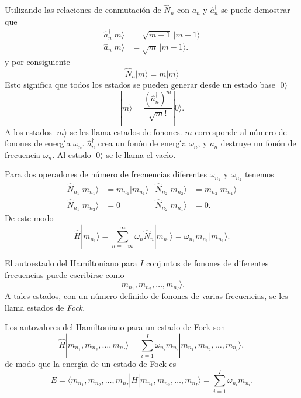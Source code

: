 Utilizando las relaciones de conmutaci\'on de $\widehat{N}_n$ con $a_n$ y $\hat{a}^\dagger_n$ se puede demostrar que 
\begin{align}
  \hat{a}^\dagger_n|m\rangle&=\sqrt{m+1}\,|m+1\rangle\nonumber\\
  \hat{a}_n|m\rangle&=\sqrt{m}\,|m-1\rangle.
\end{align}
y por consiguiente
\begin{equation}
  \widehat{N}_n|m\rangle=m|m\rangle
\end{equation}
Esto significa que todos los estados se pueden generar desde un estado base $|0\rangle$
\begin{equation}
  |m\rangle=\frac{\left(\hat{a}^\dagger_n\right)^m}{\sqrt{m}!}|0\rangle.
\end{equation}
A los estados $|m\rangle$ se les llama estados de fonones. $m$ corresponde al n\'umero de fonones de energ\'\i a $\omega_n$. $\hat{a}^\dagger_n$ crea un fon\'on de energ\'\i a $\omega_n$, y $a_n$ destruye un fon\'on de frecuencia $\omega_n$. Al estado $|0\rangle$ se le llama el vac\'\i o. 

Para dos operadores de n\'umero de frecuencias diferentes $\omega_{n_1}$ y $\omega_{n_2}$ tenemos
\begin{align}
  \widehat{N}_{n_1}|m_{n_1}\rangle&=m_{n_1}|m_{n_1}\rangle& \widehat{N}_{n_2}|m_{n_2}\rangle&=m_{n_2}|m_{n_1}\rangle\nonumber\\
  \widehat{N}_{n_1}|m_{n_2}\rangle&=0& \widehat{N}_{n_2}|m_{n_1}\rangle&=0.
\end{align}
De este modo
\begin{equation}
  \label{eq:143}
  \widehat{H}|m_{n_1}\rangle=\sum_{n=-\infty}^\infty\omega_{n}\widehat{N}_{n}|m_{n_1}\rangle=\omega_{n_1}m_{n_1}|m_{n_1}\rangle.
\end{equation}


El autoestado del Hamiltoniano para $I$ conjuntos de fonones de diferentes frecuencias puede escribirse como
\begin{equation}
  |m_{n_1},m_{n_2},\ldots,m_{n_I}\rangle.
\end{equation}
A tales estados, con un n\'umero definido de fonones de varias frecuencias, se les llama estados de \emph{Fock}. 

Los autovalores del Hamiltoniano para un estado de Fock son
\begin{equation}
  \widehat{H} |m_{n_1},m_{n_2},\ldots,m_{n_I}\rangle=\sum_{i=1}^I\omega_{n_i}m_{n_i} |m_{n_1},m_{n_2},\ldots,m_{n_i}\rangle,
\end{equation}
de modo que la energ\'\i a de un estado de Fock es
\begin{equation}
  E=\langle m_{n_1},m_{n_2},\ldots,m_{n_I}|\widehat{H} |m_{n_1},m_{n_2},\ldots,m_{n_I}\rangle=\sum_{i=1}^I\omega_{n_i}m_{n_i}.
\end{equation}

